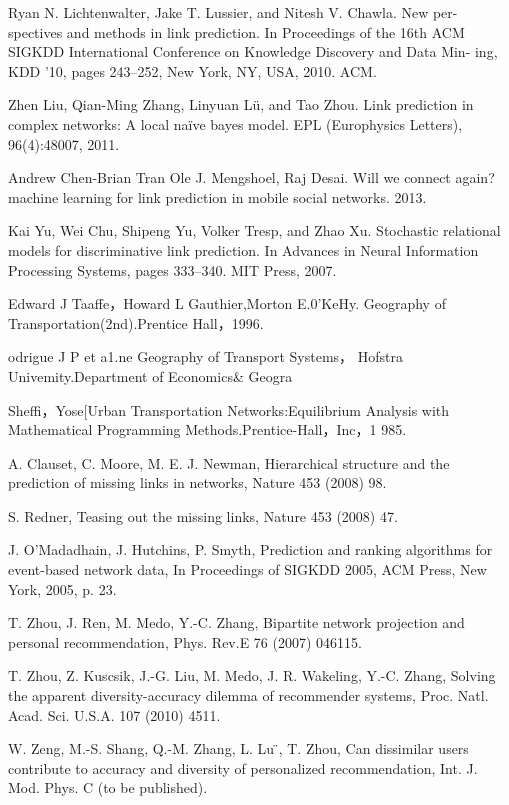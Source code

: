 \documentclass[onecolumn,preprintnumbers,amsmath,amssymb]{revtex4}
\begin{document}
\begin{thebibliography}{00}
Ryan N. Lichtenwalter, Jake T. Lussier, and Nitesh V. Chawla. New per- spectives and methods in link prediction. In Proceedings of the 16th ACM SIGKDD International Conference on Knowledge Discovery and Data Min- ing, KDD ’10, pages 243–252, New York, NY, USA, 2010. ACM.

Zhen Liu, Qian-Ming Zhang, Linyuan Lü, and Tao Zhou. Link prediction in complex networks: A local naïve bayes model. EPL (Europhysics Letters), 96(4):48007, 2011.

Andrew Chen-Brian Tran Ole J. Mengshoel, Raj Desai. Will we connect again? machine learning for link prediction in mobile social networks. 2013.

Kai Yu, Wei Chu, Shipeng Yu, Volker Tresp, and Zhao Xu. Stochastic
relational models for discriminative link prediction. In Advances in Neural Information Processing Systems, pages 333–340. MIT Press, 2007.

Edward J Taaffe，Howard L Gauthier,Morton E.0’KeHy.
Geography of Transportation(2nd).Prentice Hall，1996.

odrigue J P et a1.ne Geography of Transport Systems，
Hofstra Univemity.Department of Economics\& Geogra

Sheffi，Yose[Urban Transportation Networks:Equilibrium Analysis with Mathematical Programming Methods.Prentice-Hall，Inc，1 985.

A. Clauset, C. Moore, M. E. J. Newman, Hierarchical structure and the prediction of missing links in networks, Nature 453 (2008) 98.

S. Redner, Teasing out the missing links, Nature 453 (2008) 47.

J. O’Madadhain, J. Hutchins, P. Smyth, Prediction and ranking algorithms for event-based network data, In Proceedings of SIGKDD 2005, ACM Press, New York, 2005, p. 23.

T. Zhou, J. Ren, M. Medo, Y.-C. Zhang, Bipartite network projection and personal recommendation, Phys. Rev.E 76 (2007) 046115.

T. Zhou, Z. Kuscsik, J.-G. Liu, M. Medo, J. R. Wakeling, Y.-C. Zhang, Solving the apparent diversity-accuracy dilemma of recommender systems, Proc. Natl. Acad. Sci. U.S.A. 107 (2010) 4511.

W. Zeng, M.-S. Shang, Q.-M. Zhang, L. Lu ̈, T. Zhou, Can dissimilar users contribute to accuracy and diversity of personalized recommendation, Int. J. Mod. Phys. C (to be published).


\end{thebibliography}
\end{document}
